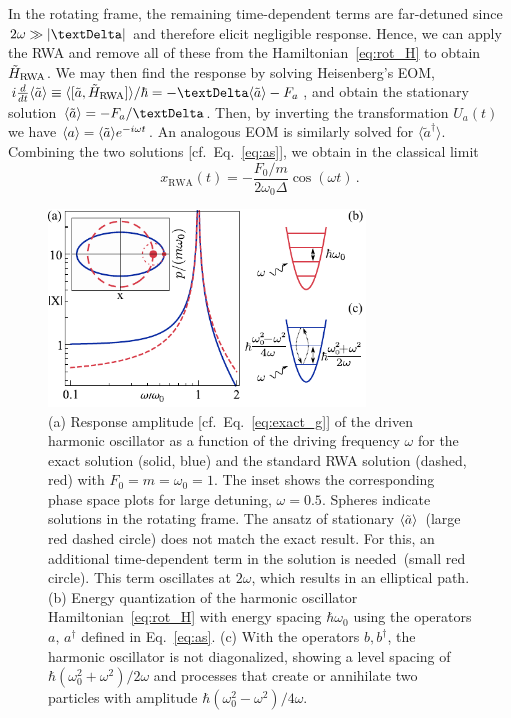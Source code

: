 In the rotating frame, the remaining time-dependent terms are far-detuned since $2\omega\gg \abs{\Delta}$ and therefore elicit negligible response. Hence, we can apply the RWA and remove all of these from the Hamiltonian~\eqref{eq:rot_H} to obtain $\tilde{H}_{\rm RWA}$. 
We may then find the response by solving Heisenberg's EOM, $i \frac{d}{dt} \etil{a} \equiv  \langle{[\tilde{a}, \tilde{H}_{\rm RWA}]}\rangle / \hbar = -\Delta \etil{a} -F_a$, and obtain the stationary solution $\etil{a} = -F_a / \Delta$. Then, by inverting the transformation $U_a(t)$ we have $\expval{a} = \langle\tilde{a}\rangle e^{-i \omega t}$. An analogous EOM is similarly solved for $\langle \tilde{a}^\dagger \rangle$. Combining the two solutions [cf.~Eq.~\eqref{eq:as}], we obtain in the classical limit
\begin{equation} \label{eq:x_RWA}
x_{\text{RWA}}(t) = -\frac{F_0/m}{2\omega_0 \Delta} \cos(\omega t)\,.
\end{equation}

\begin{figure} [h!]
	\centering
	\includegraphics[width=0.75\textwidth]{figures/rwa/fig1.pdf}
	\caption{(a) Response amplitude [cf.~Eq.~\eqref{eq:exact_g}] of the driven harmonic oscillator as a function of the driving frequency $\omega$ for the exact solution (solid, blue) and the standard RWA solution (dashed, red) with $F_0=m=\omega_0=1$. The inset shows the corresponding phase space plots for large detuning, $\omega = 0.5$. Spheres indicate solutions in the rotating frame. The ansatz of stationary $\langle\tilde{a}\rangle$~(large red dashed circle) does not match the exact result. For this, an additional time-dependent term in the solution is needed~(small red circle). This term oscillates at $2\omega$, which results in an elliptical path.  (b) Energy quantization of the harmonic oscillator Hamiltonian~\eqref{eq:rot_H} with energy spacing $\hbar \omega_0$ using the operators $a,\,a^\dagger$ defined in Eq.~\eqref{eq:as}. (c) With the operators $b, b^\dagger$, the harmonic oscillator is not diagonalized, showing a level spacing of $\hbar (\omega_0^2+\omega^2)/ 2\omega$ and processes that create or annihilate two particles with amplitude $\hbar (\omega_0^2-\omega^2)/4\omega$.}
	\label{fig:fig1}
\end{figure}

